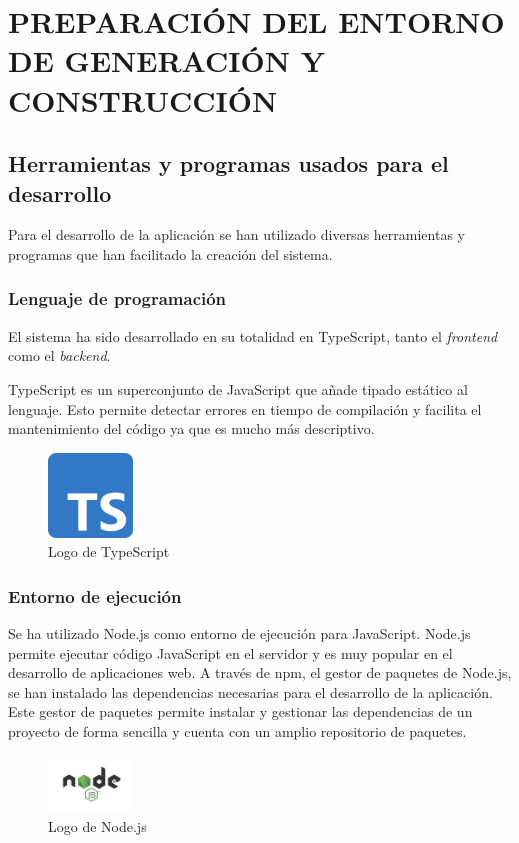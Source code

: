 
\section{PREPARACIÓN DEL ENTORNO DE GENERACIÓN Y CONSTRUCCIÓN}

\subsection{Herramientas y programas usados para el desarrollo}
Para el desarrollo de la aplicación se han utilizado diversas herramientas y programas que han facilitado la creación del sistema.  

\subsubsection{Lenguaje de programación}
El sistema ha sido desarrollado en su totalidad en TypeScript, tanto el \textit{frontend} como el \textit{backend}. 

TypeScript es un superconjunto de JavaScript que añade tipado estático al lenguaje.
Esto permite detectar errores en tiempo de compilación y facilita el mantenimiento del código ya que es mucho más descriptivo.

\begin{figure}[H]
    \centering
    \includegraphics[width=0.2\textwidth]{figures/7-Construccion/Typescript.png}
    \caption{Logo de TypeScript}
\end{figure}

\subsubsection{Entorno de ejecución}
Se ha utilizado Node.js como entorno de ejecución para JavaScript.
Node.js permite ejecutar código JavaScript en el servidor y es muy popular en el desarrollo de aplicaciones web.
A través de npm, el gestor de paquetes de Node.js, se han instalado las dependencias necesarias para el desarrollo de la aplicación.
Este gestor de paquetes permite instalar y gestionar las dependencias de un proyecto de forma sencilla y cuenta con un amplio repositorio de paquetes.

\begin{figure}[H]
    \centering
    \includegraphics[width=0.2\textwidth]{figures/7-Construccion/Nodejs.jpeg}
    \caption{Logo de Node.js}
\end{figure}



